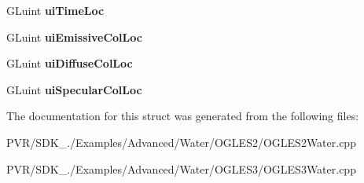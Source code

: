 \begin{DoxyCompactItemize}
\item 
\hypertarget{struct_model_shader_ace0dafb9a53c9f36a095def1a31b82fa}{G\+Luint {\bfseries ui\+Time\+Loc}}\label{struct_model_shader_ace0dafb9a53c9f36a095def1a31b82fa}

\item 
\hypertarget{struct_model_shader_a9b37f5546b2082c4c26a1dfc7dcc1b93}{G\+Luint {\bfseries ui\+Emissive\+Col\+Loc}}\label{struct_model_shader_a9b37f5546b2082c4c26a1dfc7dcc1b93}

\item 
\hypertarget{struct_model_shader_adbdae078c67987e5f6b28258c1d9709b}{G\+Luint {\bfseries ui\+Diffuse\+Col\+Loc}}\label{struct_model_shader_adbdae078c67987e5f6b28258c1d9709b}

\item 
\hypertarget{struct_model_shader_af7566e31d021d868829188cc2c89aa50}{G\+Luint {\bfseries ui\+Specular\+Col\+Loc}}\label{struct_model_shader_af7566e31d021d868829188cc2c89aa50}

\end{DoxyCompactItemize}


The documentation for this struct was generated from the following files\+:\begin{DoxyCompactItemize}
\item 
P\+V\+R/\+S\+D\+K\+\_./\+Examples/\+Advanced/\+Water/\+O\+G\+L\+E\+S2/O\+G\+L\+E\+S2\+Water.\+cpp\item 
P\+V\+R/\+S\+D\+K\+\_./\+Examples/\+Advanced/\+Water/\+O\+G\+L\+E\+S3/O\+G\+L\+E\+S3\+Water.\+cpp\end{DoxyCompactItemize}
